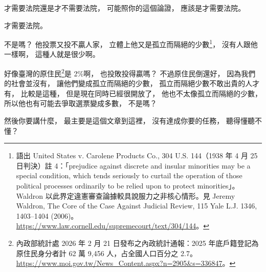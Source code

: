 \hypertarget{w06:cue:3128}{}才需要法院還是才不需要法院，
\hypertarget{w06:cue:3129}{}可能照你的這個論證，
\hypertarget{w06:cue:3130}{}應該是才需要法院。

\hypertarget{w06:cue:3131}{}才需要法院。

\hypertarget{w06:cue:3132}{}不是嗎？
\hypertarget{w06:cue:3133}{}他投票又投不贏人家，
\hypertarget{w06:cue:3134}{}立體上他又是孤立而隔絕的少數\footnote{語出 United States v. Carolene Products Co., 304 U.S. 144（1938 年 4 月 25 日判決）註 4：「prejudice against discrete and insular minorities may be a special condition, which tends seriously to curtail the operation of those political processes ordinarily to be relied upon to protect minorities」。Waldron 以此界定違憲審查論據較具說服力之非核心情形。見 Jeremy Waldron, The Core of the Case Against Judicial Review, 115 Yale L.J. 1346, 1403–1404 (2006)。\url{https://www.law.cornell.edu/supremecourt/text/304/144}。}，
\hypertarget{w06:cue:3135}{}沒有人跟他一樣啊，
\hypertarget{w06:cue:3136}{}這種人就是很少啊。

\hypertarget{w06:cue:3137}{}好像臺灣的原住民\footnote{內政部統計處 2026 年 2 月 21 日發布之內政統計通報：2025 年底戶籍登記為原住民身分者計 62 萬 9,456 人，占全國人口百分之 2.7。\url{https://www.moi.gov.tw/News_Content.aspx?n=2905&s=336847}。}是 2\%啊，
\hypertarget{w06:cue:3138}{}也投敗投得贏嗎？
\hypertarget{w06:cue:3139}{}不過原住民倒還好，
\hypertarget{w06:cue:3140}{}因為我們的社會並沒有，
\hypertarget{w06:cue:3141}{}讓他們變成孤立而隔絕的少數，
\hypertarget{w06:cue:3142}{}孤立而隔絕少數不敢出貴的人才有，
\hypertarget{w06:cue:3143}{}比較是這種，
\hypertarget{w06:cue:3144}{}但是現在同時已經很開放了，
\hypertarget{w06:cue:3145}{}他也不太像孤立而隔絕的少數，
\hypertarget{w06:cue:3146}{}所以他也有可能去爭取選票變成多數，
\hypertarget{w06:cue:3147}{}不是嗎？

\hypertarget{w06:cue:3148}{}然後你要講什麼，
\hypertarget{w06:cue:3149}{}最主要是這個文章到這裡，
\hypertarget{w06:cue:3150}{}沒有達成你要的任務，
\hypertarget{w06:cue:3151}{}聽得懂聽不懂？

